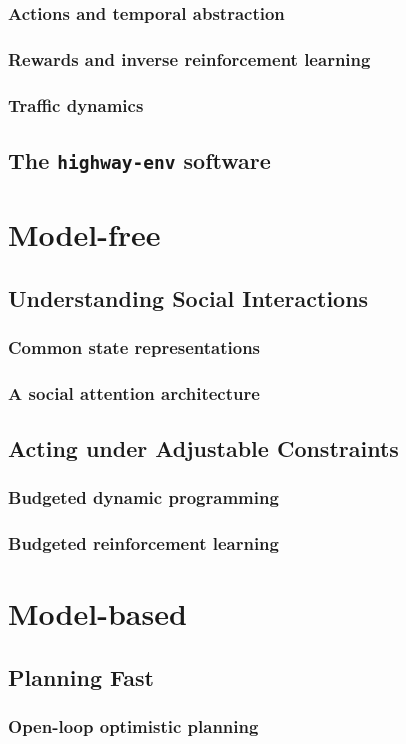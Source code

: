 \section{Actions and temporal abstraction}
\section{Rewards and inverse reinforcement learning}
\section{Traffic dynamics}
\chapter{The \texttt{highway-env} software}
\part{Model-free}
\chapter{Understanding Social Interactions}
\section{Common state representations}
\section{A social attention architecture}
\chapter{Acting under Adjustable Constraints}
\section{Budgeted dynamic programming}
\section{Budgeted reinforcement learning}
\part{Model-based}
\chapter{Planning Fast}
\section{Open-loop optimistic planning}
